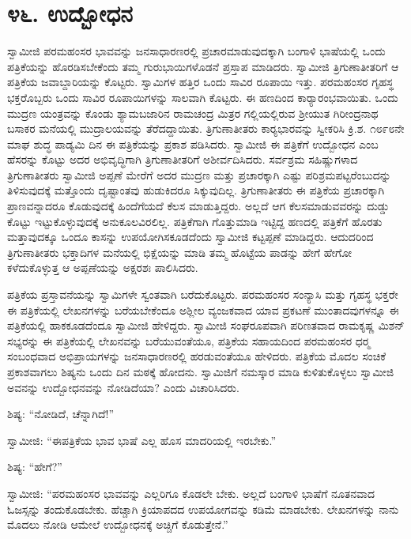 
\chapter*{೪೬. ಉದ್ಬೋಧನ }

 ಸ್ವಾಮೀಜಿ ಪರಮಹಂಸರ ಭಾವವನ್ನು ಜನಸಾಧಾರಣರಲ್ಲಿ ಪ್ರಚಾರಮಾಡುವುದಕ್ಕಾಗಿ ಬಂಗಾಳಿ ಭಾಷೆಯಲ್ಲಿ ಒಂದು ಪತ್ರಿಕೆಯನ್ನು ಹೊರಡಿಸಬೇಕೆಂದು ತಮ್ಮ ಗುರುಭಾಯಿಗಳೊಡನೆ ಪ್ರಸ್ತಾಪ ಮಾಡಿದರು. ಸ್ವಾಮೀಜಿ ತ್ರಿಗುಣಾತೀತರಿಗೆ ಆ ಪತ್ರಿಕೆಯ ಜವಾಬ್ದಾರಿಯನ್ನು ಕೊಟ್ಟರು. ಸ್ವಾಮಿಗಳ ಹತ್ತಿರ ಒಂದು ಸಾವಿರ ರೂಪಾಯಿ ಇತ್ತು. ಪರಮಹಂಸರ ಗೃಹಸ್ಥ ಭಕ್ತರೊಬ್ಬರು ಒಂದು ಸಾವಿರ ರೂಪಾಯಿಗಳನ್ನು ಸಾಲವಾಗಿ ಕೊಟ್ಟರು. ಈ ಹಣದಿಂದ ಕಾರ‍್ಯಾರಂಭವಾಯಿತು. ಒಂದು ಮುದ್ರಣ ಯಂತ್ರವನ್ನು ಕೊಂಡು ಶ್ಯಾಮಬಜಾರಿನ ರಾಮಚಂದ್ರ ಮಿತ್ರರ ಗಲ್ಲಿಯಲ್ಲಿರುವ ಶ‍್ರೀಯುತ ಗಿರೀಂದ್ರನಾಥ ಬಸಾಕರ ಮನೆಯಲ್ಲಿ ಮುದ್ರಾಲಯವನ್ನು ತೆರೆದದ್ದಾಯಿತು. ತ್ರಿಗುಣಾತೀತರು ಕಾರ‍್ಯಭಾರವನ್ನು ಸ್ವೀಕರಿಸಿ ಕ್ರಿ.ಶ. ೧೮೯೮ನೇ ಮಾಘ ಶುದ್ಧ ಪಾಡ್ಯಮಿ ದಿನ ಈ ಪತ್ರಿಕೆಯನ್ನು ಪ್ರಕಾಶ ಪಡಿಸಿದರು. ಸ್ವಾಮೀಜಿ ಈ ಪತ್ರಿಕೆಗೆ ಉದ್ಬೋಧನ ಎಂಬ ಹೆಸರನ್ನು ಕೊಟ್ಟು ಅದರ ಅಭಿವೃದ್ಧಿಗಾಗಿ ತ್ರಿಗುಣಾತೀತರಿಗೆ ಅಶೀರ್ವದಿಸಿದರು. ಸರ್ವಶ್ರಮ ಸಹಿಷ್ಣುಗಳಾದ ತ್ರಿಗುಣಾತೀತರು ಸ್ವಾಮೀಜಿ ಅಪ್ಪಣೆ ಮೇರೆಗೆ ಅದರ ಮುದ್ರಣ ಮತ್ತು ಪ್ರಚಾರಕ್ಕಾಗಿ ಎಷ್ಟು ಪರಿಶ್ರಮಪಟ್ಟರೆಂಬುದನ್ನು ತಿಳಿಸುವುದಕ್ಕೆ ಮತ್ತೊಂದು ದೃಷ್ಟಾಂತವು ಹುಡುಕಿದರೂ ಸಿಕ್ಕುವುದಿಲ್ಲ. ತ್ರಿಗುಣಾತೀತರು ಈ ಪತ್ರಿಕೆಯ ಪ್ರಚಾರಕ್ಕಾಗಿ ಪ್ರಾಣವನ್ನಾದರೂ ಕೊಡುವುದಕ್ಕೆ ಹಿಂದೆಗೆಯದೆ ಕೆಲಸ ಮಾಡುತ್ತಿದ್ದರು. ಅಲ್ಲದೆ ಆಗ ಕೆಲಸಮಾಡುವವರನ್ನು ದುಡ್ಡು ಕೊಟ್ಟು ಇಟ್ಟುಕೊಳ್ಳುವುದಕ್ಕೆ ಅನುಕೂಲವಿರಲಿಲ್ಲ. ಪತ್ರಿಕೆಗಾಗಿ ಗೊತ್ತುಮಾಡಿ ಇಟ್ಟಿದ್ದ ಹಣದಲ್ಲಿ ಪತ್ರಿಕೆಗೆ ಹೊರತು ಮತ್ತಾವುದಕ್ಕೂ ಒಂದೂ ಕಾಸನ್ನು ಉಪಯೋಗಿಸಕೂಡದೆಂದು ಸ್ವಾಮೀಜಿ ಕಟ್ಟಪ್ಪಣೆ ಮಾಡಿದ್ದರು. ಆದುದರಿಂದ ತ್ರಿಗುಣಾತೀತರು ಭಕ್ತಾದಿಗಳ ಮನೆಯಲ್ಲಿ ಭಿಕ್ಷೆಯನ್ನು ಮಾಡಿ ತಮ್ಮ ಹೊಟ್ಟೆಯ ಪಾಡನ್ನು ಹೇಗೆ ಹೇಗೋ ಕಳೆದುಕೊಳ್ಳುತ್ತ ಆ ಅಪ್ಪಣೆಯನ್ನು ಅಕ್ಷರಶಃ ಪಾಲಿಸಿದರು. 

 ಪತ್ರಿಕೆಯ ಪ್ರಸ್ತಾವನೆಯನ್ನು ಸ್ವಾಮಿಗಳೇ ಸ್ವಂತವಾಗಿ ಬರೆದುಕೊಟ್ಟರು. ಪರಮಹಂಸರ ಸಂನ್ಯಾಸಿ ಮತ್ತು ಗೃಹಸ್ಥ ಭಕ್ತರೇ ಈ ಪತ್ರಿಕೆಯಲ್ಲಿ ಲೇಖನಗಳನ್ನು ಬರೆಯಬೇಕೆಂದೂ ಅಶ್ಲೀಲ ವ್ಯಂಜಕವಾದ ಯಾವ ಪ್ರಕಟಣೆ ಮುಂತಾದವುಗಳನ್ನೂ ಈ ಪತ್ರಿಕೆಯಲ್ಲಿ ಹಾಕಕೂಡದೆಂದೂ ಸ್ವಾಮೀಜಿ ಹೇಳಿದ್ದರು. ಸ್ವಾಮೀಜಿ ಸಂಘರೂಪವಾಗಿ ಪರಿಣತವಾದ ರಾಮಕೃಷ್ಣ ಮಿಶನ್ ಸಭ್ಯರನ್ನು ಈ ಪತ್ರಿಕೆಯಲ್ಲಿ ಲೇಖನವನ್ನು ಬರೆಯುವಂತೆಯೂ, ಪತ್ರಿಕೆಯ ಸಹಾಯದಿಂದ ಪರಮಹಂಸರ ಧರ‍್ಮ ಸಂಬಂಧವಾದ ಅಭಿಪ್ರಾಯಗಳನ್ನು ಜನಸಾಧಾರಣರಲ್ಲಿ ಹರಡುವಂತೆಯೂ ಹೇಳಿದರು. ಪತ್ರಿಕೆಯ ಮೊದಲ ಸಂಚಿಕೆ ಪ್ರಕಾಶವಾಗಲು ಶಿಷ್ಯನು ಒಂದು ದಿನ ಮಠಕ್ಕೆ ಹೋದನು. ಸ್ವಾಮಿಜಿಗೆ ನಮಸ್ಕಾರ ಮಾಡಿ ಕುಳಿತುಕೊಳ್ಳಲು ಸ್ವಾಮೀಜಿ ಅವನನ್ನು ಉದ್ಬೋಧನವನ್ನು ನೋಡಿದೆಯಾ? ಎಂದು ವಿಚಾರಿಸಿದರು. 

 ಶಿಷ್ಯ: “ನೋಡಿದೆ, ಚೆನ್ನಾಗಿದೆ!” 

 ಸ್ವಾಮೀಜಿ: “ಈ‌ಪತ್ರಿಕೆಯ ಭಾವ ಭಾಷೆ ಎಲ್ಲ ಹೊಸ ಮಾದರಿಯಲ್ಲಿ ಇರಬೇಕು.” 

 ಶಿಷ್ಯ: “ಹೇಗೆ?” 

 ಸ್ವಾಮೀಜಿ: “ಪರಮಹಂಸರ ಭಾವವನ್ನು ಎಲ್ಲರಿಗೂ ಕೊಡಲೇ ಬೇಕು. ಅಲ್ಲದೆ ಬಂಗಾಳಿ ಭಾಷೆಗೆ ನೂತನವಾದ ಓಜಸ್ಸನ್ನು ತಂದುಕೊಡಬೇಕು. ಹೆಚ್ಚಾಗಿ ಕ್ರಿಯಾಪದದ ಉಪಯೋಗವನ್ನು ಕಡಿಮೆ ಮಾಡಬೇಕು. ಲೇಖನಗಳನ್ನು ನಾನು ಮೊದಲು ನೋಡಿ ಆಮೇಲೆ ಉದ್ಬೋಧನಕ್ಕೆ ಅಚ್ಚಿಗೆ ಕೊಡುತ್ತೇನೆ.” 


